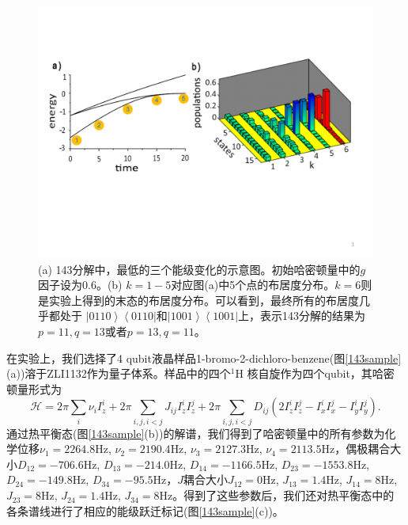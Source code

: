 \begin{figure}[htbp]
            \begin{center}
              \includegraphics[width= 0.8\columnwidth]{figures/143sim.pdf}
              \caption{(a) 143分解中，最低的三个能级变化的示意图。初始哈密顿量中的$g$因子设为0.6。(b) $k = 1-5$对应图(a)中5个点的布居度分布。$k = 6$则是实验上得到的末态的布居度分布。可以看到，最终所有的布居度几乎都处于
              $\left \vert 0110 \right \rangle \left \langle 0110 \right \vert$和$\left \vert 1001 \right \rangle \left \langle 1001 \right \vert$上，表示143分解的结果为$p =11,q=13$或者$p = 13,q=11$。}
              \label{143sim}
            \end{center}
\end{figure}

在实验上，我们选择了4 qubit液晶样品1-bromo-2-dichloro-benzene(图\ref{143sample}(a))溶于ZLI1132作为量子体系。样品中的四个$^1$H
核自旋作为四个qubit，其哈密顿量形式为
\begin{equation}
 \mathcal{H} = 2\pi\sum_i \nu_i
 I_z^i+2\pi\sum_{i,j,i<j}J_{ij}I_z^iI_z^j
 +2\pi\sum_{i,j,i<j}D_{ij}(2I_z^iI_z^j-I_x^iI_x^j-I_y^iI_y^j).
\end{equation}
通过热平衡态(图\ref{143sample}(b))的解谱，我们得到了哈密顿量中的所有参数为化学位移$\nu_1=2264.8$Hz, $\nu_2=2190.4$Hz,
$\nu_3=2127.3$Hz, $\nu_4=2113.5$Hz，偶极耦合大小$D_{12}=-706.6 $Hz, $D_{13}=-214.0$Hz, $D_{14}= -1166.5$Hz,
$D_{23}=-1553.8$Hz, $D_{24}=-149.8$Hz, $D_{34}=  -95.5$Hz，$J$耦合大小$J_{12}=0$Hz, $J_{13}=1.4$Hz, $J_{14}=8$Hz,
$J_{23}=8$Hz, $J_{24}=1.4$Hz, $J_{34}=8$Hz。得到了这些参数后，我们还对热平衡态中的各条谱线进行了相应的能级跃迁标记(图\ref{143sample}(c))。


